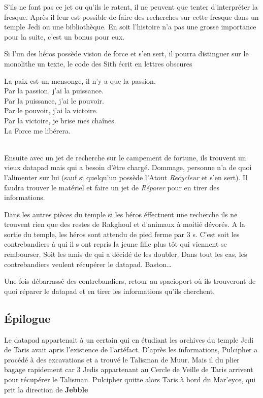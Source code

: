 S'ils ne font pas ce jet ou qu'ils le ratent, il ne peuvent que tenter d'interpréter la fresque. Après il leur est possible de faire des recherches sur cette fresque dans un temple Jedi ou une bibliothèque. En soit l'histoire n'a pas une grosse importance pour la suite, c'est un bonus pour eux.

Si l'un des héros possède vision de force et s'en sert, il pourra distinguer sur le monolithe un texte, le code des Sith écrit en lettres obscures
\begin{quotebox}
La paix est un mensonge, il n’y a que la passion. \\
Par la passion, j’ai la puissance. \\
Par la puissance, j’ai le pouvoir. \\
Par le pouvoir, j’ai la victoire. \\
Par la victoire, je brise mes chaînes. \\
La Force me libérera.
\end{quotebox}
\\

Ensuite avec un jet de recherche sur le campement de fortune, ils trouvent un vieux datapad mais qui a besoin d'être chargé. Dommage, personne n'a de quoi l'alimenter sur lui (sauf si quelqu'un possède l'Atout \emph{Recycleur} et s'en sert). Il faudra trouver le matériel et faire un jet de \emph{Réparer} pour en tirer des informations.

Dans les autres pièces du temple si les héros éffectuent une recherche ils ne trouvent rien que des restes de Rakghoul et d'animaux à moitié dévorés.
A la sortie du temple, les héros sont attendu de pied ferme par 3 s. C'est soit les contrebandiers à qui il s ont repris la jeune fille plus tôt qui viennent se rembourser. Soit les amis de  qui a décidé de les doubler. Dans tout les cas, les contrebandiers veulent récupérer le datapad. Baston\ldots

Une fois débarrassé des contrebandiers, retour au spacioport où ils trouveront de quoi réparer le datapad et en tirer les informations qu'ils cherchent.

\subsection{\'Epilogue}
Le datapad appartenait à un certain  qui en étudiant les archives du temple Jedi de Taris avait apris l'existence de l'artéfact. D'après les informations, Pulcipher a procédé à des excavations et a trouvé le Talisman de Muur. Mais il du plier bagage rapidement car 3 Jedis appartenant au Cercle de Veille de Taris arrivent pour récupérer le Talisman. Pulcipher quitte alors Taris à bord du Mar'eyce, qui prit la direction de \textbf{Jebble}

